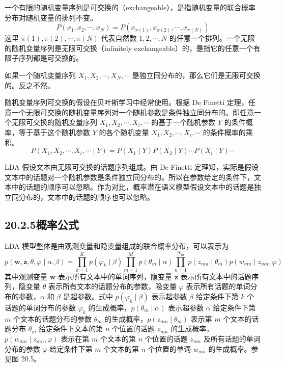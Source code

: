 \documentclass[UTF8, 12pt, fontset=fandol, oneside]{ctexart}
\begin{document}
一个有限的随机变量序列是可交换的（exchangeable），是指随机变量的联合概率分布对随机变量的排列不变。
\begin{equation}
P(x_1,x_2,\cdots,x_N)=P(x_{\pi(1)},x_{\pi(2)},\cdots,x_{\pi(N)})
\tag{20.13}
\end{equation}
这里 $\pi(1),\pi(2),\cdots,\pi(N)$ 代表自然数 $1,2,\cdots,N$ 的任意一个排列。一个无限的随机变量序列是无限可交换（infinitely exchangeable）的，是指它的任意一个有限子序列都是可交换的。

如果一个随机变量序列 $X_1,X_2,\cdots,X_N,\cdots$ 是独立同分布的，那么它们是无限可交换的。反之不然。

随机变量序列可交换的假设在贝叶斯学习中经常使用。根据 De Finetti 定理，任意一个无限可交换的随机变量序列对一个随机参数是条件独立同分布的。即任意一个无限可交换的随机变量序列 $X_1,X_2,\cdots,X_i,\cdots$ 的基于一个随机参数 $Y$ 的条件概率，等于基于这个随机参数 $Y$ 的各个随机变量 $X_1,X_2,\cdots,X_i,\cdots$ 的条件概率的乘积。
\begin{equation}
P(X_1,X_2,\cdots,X_i,\cdots\mid Y)=P(X_1\mid Y)P(X_2\mid Y)\cdots P(X_i\mid Y)\cdots
\tag{20.14}
\end{equation}

LDA 假设文本由无限可交换的话题序列组成。由 De Finetti 定理知，实际是假设文本中的话题对一个随机参数是条件独立同分布的。所以在参数给定的条件下，文本中的话题的顺序可以忽略。作为对比，概率潜在语义模型假设文本中的话题是独立同分布的，文本中的话题的顺序也可以忽略。

\subsection*{20.2.5\quad 概率公式}

LDA 模型整体是由观测变量和隐变量组成的联合概率分布，可以表示为
\begin{equation}
p(\mathbf{w},\mathbf{z},\theta,\varphi\mid\alpha,\beta)=\prod_{k=1}^K p(\varphi_k\mid\beta)\prod_{m=1}^M p(\theta_m\mid\alpha)\prod_{n=1}^{N_m}p(z_{mn}\mid\theta_m)p(w_{mn}\mid z_{mn},\varphi)
\tag{20.15}
\end{equation}
其中观测变量 $\mathbf{w}$ 表示所有文本中的单词序列，隐变量 $\mathbf{z}$ 表示所有文本中的话题序列，隐变量 $\theta$ 表示所有文本的话题分布的参数，隐变量 $\varphi$ 表示所有话题的单词分布的参数，$\alpha$ 和 $\beta$ 是超参数。式中 $p(\varphi_k\mid\beta)$ 表示超参数 $\beta$ 给定条件下第 $k$ 个话题的单词分布的参数 $\varphi_k$ 的生成概率，$p(\theta_m\mid\alpha)$ 表示超参数 $\alpha$ 给定条件下第 $m$ 个文本的话题分布的参数 $\theta_m$ 的生成概率，$p(z_{mn}\mid\theta_m)$ 表示第 $m$ 个文本的话题分布 $\theta_m$ 给定条件下文本的第 $n$ 个位置的话题 $z_{mn}$ 的生成概率，$p(w_{mn}\mid z_{mn},\varphi)$ 表示在第 $m$ 个文本的第 $n$ 个位置的话题 $z_{mn}$ 及所有话题的单词分布的参数 $\varphi$ 给定条件下第 $m$ 个文本的第 $n$ 个位置的单词 $w_{mn}$ 的生成概率。参见图 20.5。
\end{document}
